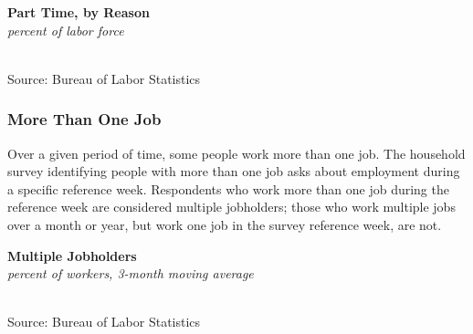 \documentclass{report}
\makeatletter
\newcommand{\tbllink}[1]{\href{https://raw.githubusercontent.com/bdecon/US-chartbook/master/chartbook/data/#1}{\faTable}}
\newcommand*\short[1]{\expandafter\@gobbletwo\number\numexpr#1\relax}
\newcommand{\absnode}[3]{\node[below right, align=left] at (axis cs: #1,#2) {#3};}
\newcommand{\shdateaxisticks}{
		date coordinates in=x, axis line style={draw=none},
		xmax={2023-02-15},
		max space between ticks=40,	    
		xtick={{1990-01-01}, {1995-01-01}, {2000-01-01}, 
			{2005-01-01}, {2010-01-01}, {2015-01-01}, {2020-01-01}},
		minor xtick={},
		enlarge y limits={0.06}, enlarge x limits={0.01},
		}
\newcommand{\bbar}[2]{extra #1 ticks = {{#2}}, extra #1 tick labels = ,
		extra #1 tick style = {grid=major, grid style={thick, black!25}},}
\newcommand{\stdline}[4]{\addplot[very thick, no markers, color=#1] 
		table [x=#2, y=#3, col sep=comma] {#4};	}
\newcommand{\thickline}[4]{\addplot[ultra thick, no markers, color=#1] 
		table [x=#2, y=#3, col sep=comma] {#4};	}
\newcommand{\rebars}{
		\fill[color=black!10] (axis cs:{2007-12-01},\pgfkeysvalueof{/pgfplots/ymin}) rectangle 
			(axis cs:{2009-07-01}, \pgfkeysvalueof{/pgfplots/ymax});
		\fill[color=black!10] (axis cs:{2001-03-01},\pgfkeysvalueof{/pgfplots/ymin}) rectangle 
			(axis cs:{2001-11-01}, \pgfkeysvalueof{/pgfplots/ymax});
		\fill[color=black!10] (axis cs:{2020-02-01},\pgfkeysvalueof{/pgfplots/ymin}) rectangle 
			(axis cs:{2020-05-01}, \pgfkeysvalueof{/pgfplots/ymax});}
\makeatother
\begin{document}
{\begin{minipage}{0.76\textwidth}
\begin{minipage}{0.56\textwidth}
\normalsize \textbf{Part Time, by Reason}\\
\footnotesize{\textit{percent of labor force}}\\
\hspace*{-2mm} \\
\footnotesize{Source: Bureau of Labor Statistics} \hfill \tbllink{parttime.csv} 
\end{minipage}\hfill
\begin{minipage}{0.38\textwidth}
\small 
\end{minipage}
\vspace{1mm}

\subsubsection*{More Than One Job}
\small Over a given period of time, some people work more than one job. The household survey identifying people with more than one job asks about employment during a specific reference week. Respondents who work more than one job during the reference week are considered multiple jobholders; those who work multiple jobs over a month or year, but work one job in the survey reference week, are not. 
\vspace{0.5mm}

\begin{minipage}{0.56\textwidth}
\normalsize \textbf{Multiple Jobholders}\\
\footnotesize{\textit{percent of workers, 3-month moving average}}\\
\hspace*{-3mm} \\
\footnotesize{Source: Bureau of Labor Statistics} \hfill \tbllink{mjh.csv} 
\end{minipage} \hfill
\begin{minipage}{0.38\textwidth}
\small 
\end{minipage}
\end{minipage}
\newpage
\begin{minipage}{0.76\textwidth}

\end{minipage}}
\end{document}
